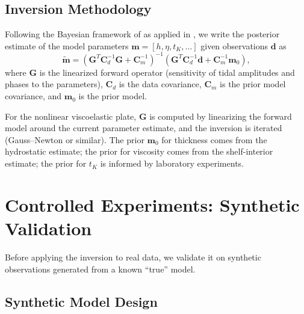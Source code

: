 \documentclass[11pt,letterpaper]{article}
\begin{document}
\subsection{Inversion Methodology}
\label{sec:inversion_method}

Following the Bayesian framework of \citet{Tarantola2005} as applied in \citet{Minchew2017}, we write the posterior estimate of the model parameters $\bm{m} = [h, \eta, t_K, \ldots]$ given observations $\bm{d}$ as
\begin{equation}
  \tilde{\bm{m}} = \left(\bm{G}^T \bm{C}_d^{-1} \bm{G} + \bm{C}_m^{-1}\right)^{-1}\!\left(\bm{G}^T \bm{C}_d^{-1} \bm{d} + \bm{C}_m^{-1} \bm{m}_0\right),
  \label{eq:posterior}
\end{equation}
where $\bm{G}$ is the linearized forward operator (sensitivity of tidal amplitudes and phases to the parameters), $\bm{C}_d$ is the data covariance, $\bm{C}_m$ is the prior model covariance, and $\bm{m}_0$ is the prior model.

For the nonlinear viscoelastic plate, $\bm{G}$ is computed by linearizing the forward model around the current parameter estimate, and the inversion is iterated (Gauss--Newton or similar).  The prior $\bm{m}_0$ for thickness comes from the hydrostatic estimate; the prior for viscosity comes from the shelf-interior estimate; the prior for $t_K$ is informed by laboratory experiments.

\section{Controlled Experiments: Synthetic Validation}
\label{sec:synthetics}

Before applying the inversion to real data, we validate it on synthetic observations generated from a known ``true'' model.

\subsection{Synthetic Model Design}
\label{sec:synth_design}
\end{document}
